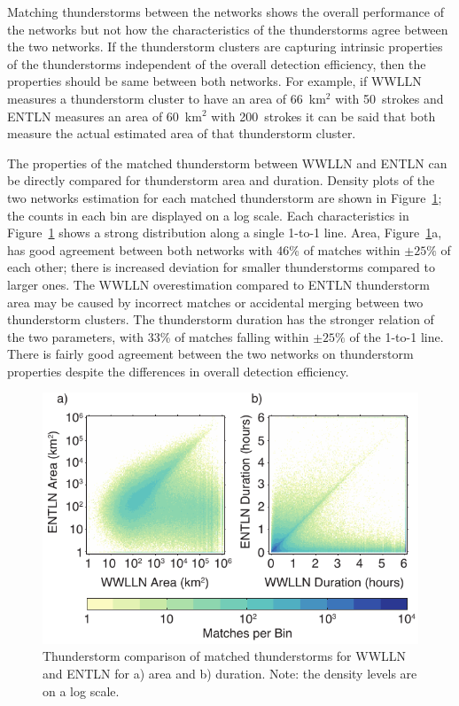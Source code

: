 Matching thunderstorms between the networks shows the overall performance of the networks but not how the characteristics of the thunderstorms agree between the two networks.
If the thunderstorm clusters are capturing intrinsic properties of the thunderstorms independent of the overall detection efficiency, then the properties should be same between both networks.
For example, if WWLLN measures a thunderstorm cluster to have an area of 66~km$^2$ with 50~strokes and ENTLN measures an area of 60~km$^2$ with 200~strokes it can be said that both measure the actual estimated area of that thunderstorm cluster.

The properties of the matched thunderstorm  between WWLLN and ENTLN can be directly compared for thunderstorm area and duration.
Density plots of the two networks estimation for each matched thunderstorm are shown in Figure~\ref{thunderstorm:fig:deSim}; the counts in each bin are displayed on a log scale.
Each characteristics in Figure~\ref{thunderstorm:fig:deSim} shows a strong distribution along a single 1-to-1 line.
Area, Figure~\ref{thunderstorm:fig:deSim}a, has good agreement between both networks with 46\% of matches within $\pm25\%$ of each other; there is increased deviation for smaller thunderstorms compared to larger ones.
The WWLLN overestimation compared to ENTLN thunderstorm area may be caused by incorrect matches or accidental merging between two thunderstorm clusters.
The thunderstorm duration has the stronger relation of the two parameters, with 33\% of matches falling within $\pm25\%$ of the 1-to-1 line.
There is fairly good agreement between the two networks on thunderstorm properties despite the differences in overall detection efficiency.

\begin{figure}[ht!]
   \centering
   \includegraphics[scale=1]{thunderstorm/Figures/deSim.pdf}
   \caption{Thunderstorm comparison of matched thunderstorms for WWLLN and ENTLN for a) area and b) duration.
           Note: the density levels are on a log scale.}
   \label{thunderstorm:fig:deSim}
\end{figure}


